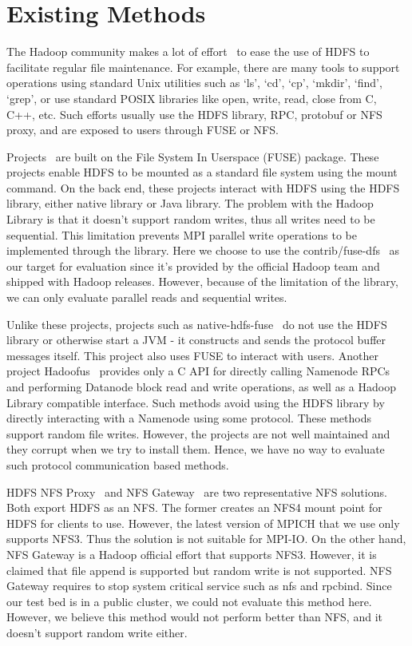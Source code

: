 \section{Existing Methods}
\label{sec:bg}
The Hadoop community makes a lot of effort~\cite{fuse} to ease the use of HDFS to
facilitate regular file maintenance. For example, there are many tools to support
operations using standard Unix
utilities such as `ls', `cd', `cp', `mkdir', `find', `grep', or use standard
POSIX libraries like open, write, read, close from C, C++, etc. Such efforts
usually use the HDFS library, RPC, protobuf or NFS proxy, and are exposed to users
through FUSE or NFS.

Projects~\cite{fuse, hdfs-fuse, fuse-j} are built on the File System In Userspace (FUSE) package. These projects enable
HDFS to be mounted as a standard file system using the mount command. On the
back end, these projects interact with HDFS using the HDFS library, either native
library or Java library. The problem with the Hadoop Library is that it doesn't
support random writes, thus all writes need to be sequential. This limitation
prevents MPI parallel write operations to be implemented through the library.
Here we choose
to use the contrib/fuse-dfs~\cite{fuse} as our target for evaluation since it's
provided by the official Hadoop team and shipped with Hadoop releases. However,
because of the limitation of the library, we can only evaluate parallel reads and
sequential writes.

Unlike
these projects, projects such as native-hdfs-fuse~\cite{native} do not use the
HDFS library or otherwise start a JVM - it constructs and sends the protocol buffer
messages itself. This project also uses FUSE to interact with users. Another
project Hadoofus~\cite{hadoofus} provides only a C
API for directly calling Namenode RPCs and performing Datanode block read and
write operations, as well as a Hadoop Library compatible interface. Such methods
avoid using the HDFS library by directly interacting with a Namenode using some
protocol. These methods support random file writes. However, the projects are
not well maintained and they corrupt when we try to install them. Hence, we have
no way to evaluate such protocol communication based methods.

HDFS NFS Proxy~\cite{proxy} and NFS Gateway~\cite{nfs} are two representative
NFS solutions. Both export HDFS as an NFS. The former creates an NFS4 mount point
for HDFS for clients to use. However, the latest version of MPICH that
we use only supports NFS3. Thus the solution is not suitable for MPI-IO. On the
other hand, NFS Gateway is a Hadoop official effort that supports NFS3. However,
it is claimed that file append is supported but random write is not supported.
NFS Gateway requires to stop system
critical service such as nfs and rpcbind. Since our test bed is in a public
cluster, we could not evaluate this method here. However, we believe this method would
not perform better than NFS, and it doesn't support random write either.


